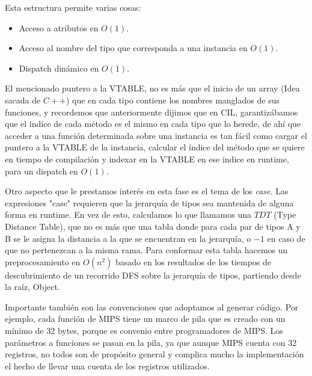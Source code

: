 \documentclass[a4paper, 12pt]{article}
\begin{document}
\begin{itemize}
Esta estructura permite varias cosas:
\begin{itemize}
	\item Acceso a atributos en $O(1)$.
	\item Acceso al nombre del tipo que corresponda a una instancia en $O(1)$.
	\item Dispatch din\'amico en $O(1)$.
\end{itemize}

El mencionado puntero a la VTABLE, no es m\'as que el inicio de un array (Idea sacada de $C++$) que en cada
tipo contiene los nombres manglados de sus funciones, y recordemos que anteriormente dijimos que en CIL, 
garantiz\'abamos que el ind\'ice de cada m\'etodo es el mismo en cada tipo que lo herede, de ah\'i que 
acceder a una funci\'on determinada sobre una instancia es tan f\'acil como cargar el puntero a la VTABLE
de la instancia, calcular el \'indice del m\'etodo que se quiere en tiempo de compilaci\'on y indexar en la 
VTABLE en ese indice en runtime, para un dispatch en $O(1)$.

Otro aspecto que le prestamos inter\'es en esta fase es el tema de los \textit{case}. Las expresiones "case"
requieren que la jerarqu\'ia de tipos sea mantenida de alguna forma en runtime. En vez de esto, calculamos 
lo que llamamos una $TDT$ (Type Distance Table), que no es m\'as que una tabla donde para cada par de tipos
A y B se le asigna la distancia a la que se encuentran en la jerarqu\'ia, o $-1$ en caso de que no pertenezcan
a la misma rama. Para conformar esta tabla hacemos un preprocesamiento en $O(n^2)$ basado en los resultados 
de los tiempos de descubrimiento de un recorrido DFS sobre la jerarqu\'ia de tipos, partiendo desde la ra\'iz,
Object.

Importante tambi\'en son las convenciones que adoptamos al generar c\'odigo. Por ejemplo, cada funci\'on
de MIPS tiene un marco de pila que es creado con un m\'inimo de 32 bytes, porque es convenio entre programadores
de MIPS. Los par\'ametros a funciones se pasan en la pila, ya que aunque MIPS cuenta con 32 registros, no todos
son de prop\'osito general y complica mucho la implementaci\'on el hecho de llevar una cuenta de los registros
utilizados.

\end{itemize}
\end{document}
